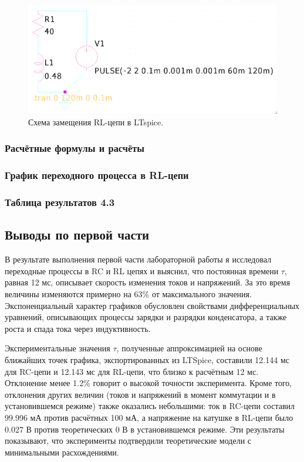 \begin{figure}[H]
	\centering
	\includegraphics[width=1\textwidth]{./data/rl-schema.png}
	\caption{Схема замещения RL-цепи в LTspice.}
\end{figure}

\subsubsection{Расчётные формулы и расчёты}


\subsubsection{График переходного процесса в RL-цепи}


\subsubsection{Таблица результатов 4.3}





\subsection{Выводы по первой части}

В результате выполнения первой части лабораторной работы я исследовал переходные процессы в RC и RL цепях и выяснил, что постоянная времени \(\tau\), равная 12 мс, описывает скорость изменения токов и напряжений. За это время величины изменяются примерно на 63\% от максимального значения. Экспоненциальный характер графиков обусловлен свойствами дифференциальных уравнений, описывающих процессы зарядки и разрядки конденсатора, а также роста и спада тока через индуктивность.

Экспериментальные значения \(\tau\), полученные аппроксимацией на основе ближайших точек графика, экспортированных из LTSpice, составили 12.144 мс для RC-цепи и 12.143 мс для RL-цепи, что близко к расчётным 12 мс. Отклонение менее 1.2\% говорит о высокой точности эксперимента. Кроме того, отклонения других величин (токов и напряжений в момент коммутации и в установившемся режиме) также оказались небольшими: ток в RC-цепи составил 99.996 мА против расчётных 100 мА, а напряжение на катушке в RL-цепи было 0.027 В против теоретических 0 В в установившемся режиме. Эти результаты показывают, что эксперименты подтвердили теоретические модели с минимальными расхождениями.

